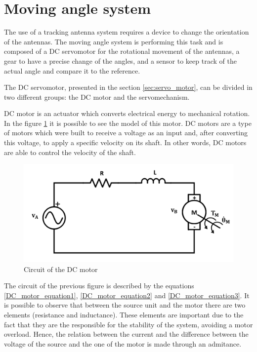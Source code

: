 
\section{Moving angle system}\label{servo_model}


The use of a tracking antenna system requires a device to change the orientation of the antennas. The moving angle system is performing this task and is composed of a DC servomotor for the rotational movement of the antennas, a gear to have a precise change of the angles, and a sensor to keep track of the actual angle and compare it to the reference.

The DC servomotor, presented in the section \ref{sec:servo_motor}, can be divided in two different groups: the DC motor and the servomechanism.

DC motor is an actuator which converts electrical energy to mechanical rotation. In the figure \ref{dcmotor_circuit} it is possible to see the model of this motor. DC motors are a type of motors which were built to receive a voltage as an input and, after converting this voltage, to apply a specific velocity on its shaft. In other words, DC motors are able to control the velocity of the shaft.

\begin{figure}[H]
\centering
\includegraphics[scale=0.5]{figures/dcmotor_circuit.png}
\caption{Circuit of the DC motor}
\label{dcmotor_circuit}
\end{figure}

The circuit of the previous figure is described by the equations \ref{DC_motor_equation1}, \ref{DC_motor_equation2} and \ref{DC_motor_equation3}. It is possible to observe that between the source unit and the motor there are two elements (resistance and inductance). These elements are important due to the fact that they are the responsible for the stability of the system, avoiding a motor overload. Hence, the relation between the current and the difference between the voltage of the source and the one of the motor is made through an admitance.

